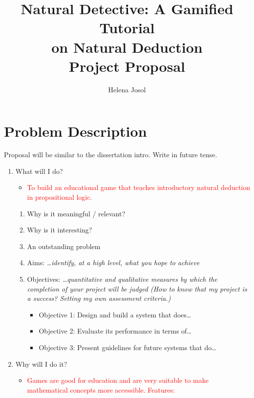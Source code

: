 \documentclass[a4paper,11pt]{article}
\title{Natural Detective: A Gamified Tutorial \\ on Natural Deduction \\ \medskip \Large{Project Proposal}}
\author{Helena Josol \autocite{adjl-blog}}
\date{}
\newcommand{\draft}[1]{\textcolor{red}{#1}} %
\begin{document}
\maketitle


\section{Problem Description} %
Proposal will be similar to the dissertation intro. Write in future tense.
\begin{enumerate}
  \item What will I do?
    \begin{itemize}
      \item \draft{To build an educational game that teaches introductory natural deduction in propositional logic.}
    \end{itemize}
    \begin{enumerate}
      \item Why is it meaningful / relevant?
      \item Why is it interesting?
      \item An outstanding problem
      \item Aims: \textit{\dots identify, at a high level, what you hope to achieve}
      \item Objectives: \textit{\dots quantitative and qualitative measures by which the completion of your project will be judged (How to know that my project is a success? Setting my own assessment criteria.)}
        \begin{itemize}
          \item Objective 1: Design and build a system that does\dots
          \item Objective 2: Evaluate its performance in terms of\dots
          \item Objective 3: Present guidelines for future systems that do\dots
        \end{itemize}
    \end{enumerate}
  \item Why will I do it?
    \begin{itemize}
      \item \draft{Games are good for education and are very suitable to make mathematical concepts more accessible. Features:}
      \begin{itemize}

\end{itemize}
\end{itemize}
\end{enumerate}
\end{document}
